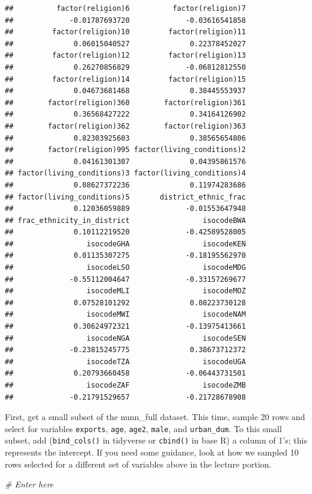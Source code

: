\documentclass[]{book}
\newenvironment{Shaded}{\begin{snugshade}}{\end{snugshade}}
\newcommand{\CommentTok}[1]{\textcolor[rgb]{0.56,0.35,0.01}{\textit{#1}}}
\theoremstyle{definition}
\theoremstyle{definition}
\theoremstyle{definition}
\theoremstyle{remark}
\begin{document}
\begin{Shaded}
\begin{Highlighting}[]
\begin{Shaded}
\begin{Highlighting}[]
\begin{verbatim}
##          factor(religion)6          factor(religion)7 
##             -0.01787693720             -0.03616541858 
##         factor(religion)10         factor(religion)11 
##              0.06015040527              0.22378452027 
##         factor(religion)12         factor(religion)13 
##              0.26270856829             -0.06812812550 
##         factor(religion)14         factor(religion)15 
##              0.04673681468              0.38445553937 
##        factor(religion)360        factor(religion)361 
##              0.36568427222              0.34164126902 
##        factor(religion)362        factor(religion)363 
##              0.82303925603              0.38565654806 
##        factor(religion)995 factor(living_conditions)2 
##              0.04161301307              0.04395861576 
## factor(living_conditions)3 factor(living_conditions)4 
##              0.08627372236              0.11974283686 
## factor(living_conditions)5       district_ethnic_frac 
##              0.12036059889             -0.01553647948 
## frac_ethnicity_in_district                 isocodeBWA 
##              0.10112219520             -0.42589528005 
##                 isocodeGHA                 isocodeKEN 
##              0.01135307275             -0.18195562970 
##                 isocodeLSO                 isocodeMDG 
##             -0.55112004647             -0.33157269677 
##                 isocodeMLI                 isocodeMOZ 
##              0.07528101292              0.08223730128 
##                 isocodeMWI                 isocodeNAM 
##              0.30624972321             -0.13975413661 
##                 isocodeNGA                 isocodeSEN 
##             -0.23815245775              0.38673712372 
##                 isocodeTZA                 isocodeUGA 
##              0.20793660458             -0.06443731501 
##                 isocodeZAF                 isocodeZMB 
##             -0.21791529657             -0.21728678908
\end{verbatim}

First, get a small subset of the nunn\_full dataset. This time, sample 20 rows and select for variables \texttt{exports}, \texttt{age}, \texttt{age2}, \texttt{male}, and \texttt{urban\_dum}. To this small subset, add (\texttt{bind\_cols()} in tidyverse or \texttt{cbind()} in base R) a column of 1's; this represents the intercept. If you need some guidance, look at how we sampled 10 rows selected for a different set of variables above in the lecture portion.

\begin{Shaded}
\begin{Highlighting}[]
\CommentTok{# Enter here}
\end{Highlighting}
\end{Shaded}


\end{Highlighting}
\end{Shaded}
\end{Highlighting}
\end{Shaded}
\end{document}

